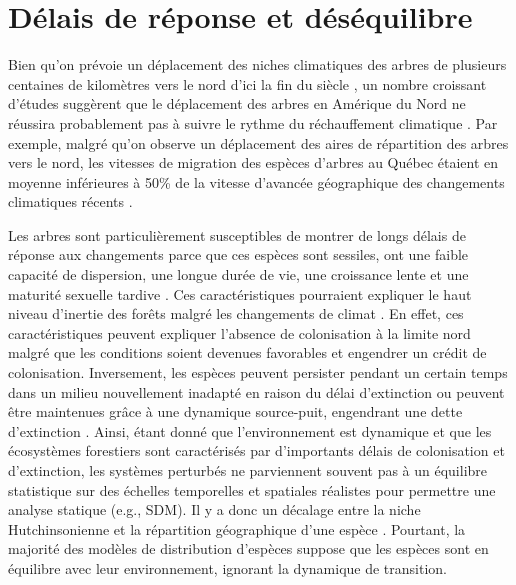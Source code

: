 \hypertarget{duxe9lais-de-ruxe9ponse-et-duxe9suxe9quilibre}{%
\section{Délais de réponse et
déséquilibre}\label{duxe9lais-de-ruxe9ponse-et-duxe9suxe9quilibre}}

Bien qu'on prévoie un déplacement des niches climatiques des arbres de
plusieurs centaines de kilomètres vers le nord d'ici la fin du siècle
\citep{mckenney_potential_2007}, un nombre croissant d'études suggèrent
que le déplacement des arbres en Amérique du Nord ne réussira
probablement pas à suivre le rythme du réchauffement climatique
\citep{zhu_failure_2012, woodall_assessing_2013, vissault_biogeographie_2016, sittaro_tree_2017}.
Par exemple, malgré qu'on observe un déplacement des aires de
répartition des arbres vers le nord, les vitesses de migration des
espèces d'arbres au Québec étaient en moyenne inférieures à 50\% de la
vitesse d'avancée géographique des changements climatiques récents
\citep{sittaro_tree_2017}.

Les arbres sont particulièrement susceptibles de montrer de longs délais
de réponse aux changements parce que ces espèces sont sessiles, ont une
faible capacité de dispersion, une longue durée de vie, une croissance
lente et une maturité sexuelle tardive
\citep{iverson_tree-species_2013, lenoir_climate-related_2015}. Ces
caractéristiques pourraient expliquer le haut niveau d'inertie des
forêts malgré les changements de climat
\citep{vissault_biogeographie_2016}. En effet, ces caractéristiques
peuvent expliquer l'absence de colonisation à la limite nord malgré que
les conditions soient devenues favorables et engendrer un crédit de
colonisation. Inversement, les espèces peuvent persister pendant un
certain temps dans un milieu nouvellement inadapté en raison du délai
d'extinction ou peuvent être maintenues grâce à une dynamique
source-puit, engendrant une dette d'extinction
\citep{pulliam_relationship_2000, jackson_balancing_2010, schurr_how_2012}.
Ainsi, étant donné que l'environnement est dynamique et que les
écosystèmes forestiers sont caractérisés par d'importants délais de
colonisation et d'extinction, les systèmes perturbés ne parviennent
souvent pas à un équilibre statistique sur des échelles temporelles et
spatiales réalistes pour permettre une analyse statique (e.g., SDM). Il
y a donc un décalage entre la niche Hutchinsonienne et la répartition
géographique d'une espèce \citep{holt_bringing_2009}. Pourtant, la
majorité des modèles de distribution d'espèces suppose que les espèces
sont en équilibre avec leur environnement, ignorant la dynamique de
transition.

